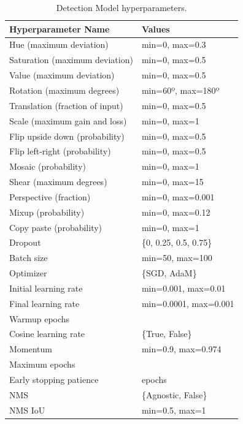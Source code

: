 \begin{table}[H]
    \centering
    \caption[Detection Model hyperparameters]{ \footnotesize Detection Model hyperparameters.}
    \label{tab:detection hyperparameters}

    \begin{tabularx}{0.9\textwidth}{
        @{\hspace{0.025\textwidth}}
        >{\raggedright\arraybackslash}X
        >{\raggedleft\arraybackslash}X
        @{\hspace{0.025\textwidth}}
    }
        \toprule
        \textbf{Hyperparameter Name} & \textbf{Values} \\
        \midrule
        \midrule
        Hue (maximum deviation) & min=0, max=0.3\\
        Saturation (maximum deviation) & min=0, max=0.5\\
        Value (maximum deviation) & min=0, max=0.5\\
        Rotation (maximum degrees) & min=60º, max=180º\\
        Translation (fraction of input) & min=0, max=0.5\\
        Scale (maximum gain and loss) & min=0, max=1\\
        Flip upside down (probability) & min=0, max=0.5\\
        Flip left-right (probability) & min=0, max=0.5\\
        Mosaic (probability) & min=0, max=1\\
        Shear (maximum degrees) & min=0, max=15\\
        Perspective (fraction) & min=0, max=0.001\\
        Mixup (probability) & min=0, max=0.12\\
        Copy paste (probability) & min=0, max=1\\
        \midrule
        Dropout & \{0, 0.25, 0.5, 0.75\} \\
        \midrule
        Batch size & min=50, max=100 \\
        Optimizer & \{SGD, AdaM\} \\
        Initial learning rate & min=0.001, max=0.01 \\
        Final learning rate & min=0.0001, max=0.001 \\
        Warmup epochs & 10 \\
        Cosine learning rate & \{True, False\} \\
        Momentum & min=0.9, max=0.974 \\
        \midrule
        Maximum epochs & 500 \\
        Early stopping patience & 50 epochs \\
        \midrule
        NMS & \{Agnostic, False\}\\
        NMS IoU & min=0.5, max=1\\
        \bottomrule
    \end{tabularx}
\end{table}

